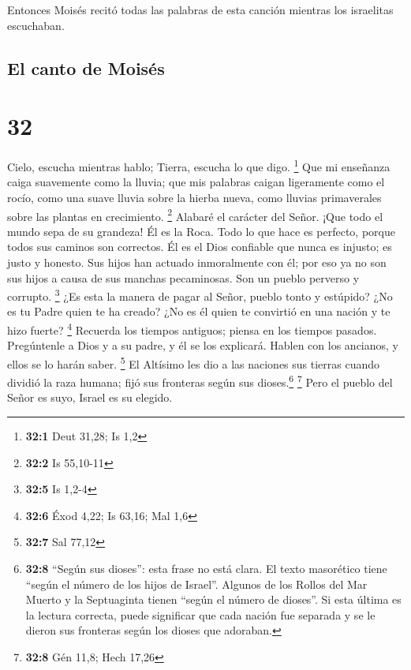  Entonces Moisés recitó todas las palabras de esta
canción mientras los israelitas escuchaban.

\hypertarget{el-canto-de-moisuxe9s}{%
\subsection{El canto de Moisés}\label{el-canto-de-moisuxe9s}}

\hypertarget{section-31}{%
\section{32}\label{section-31}}

 Cielo, escucha mientras hablo; Tierra, escucha lo que
digo. \footnote{\textbf{32:1} Deut 31,28; Is 1,2}  Que mi
enseñanza caiga suavemente como la lluvia; que mis palabras caigan
ligeramente como el rocío, como una suave lluvia sobre la hierba nueva,
como lluvias primaverales sobre las plantas en crecimiento. \footnote{\textbf{32:2}
  Is 55,10-11}  Alabaré el carácter del Señor. ¡Que todo
el mundo sepa de su grandeza!  Él es la Roca. Todo lo que
hace es perfecto, porque todos sus caminos son correctos. Él es el Dios
confiable que nunca es injusto; es justo y honesto.  Sus
hijos han actuado inmoralmente con él; por eso ya no son sus hijos a
causa de sus manchas pecaminosas. Son un pueblo perverso y corrupto.
\footnote{\textbf{32:5} Is 1,2-4}  ¿Es esta la manera de
pagar al Señor, pueblo tonto y estúpido? ¿No es tu Padre quien te ha
creado? ¿No es él quien te convirtió en una nación y te hizo fuerte?
\footnote{\textbf{32:6} Éxod 4,22; Is 63,16; Mal 1,6} 
Recuerda los tiempos antiguos; piensa en los tiempos pasados.
Pregúntenle a Dios y a su padre, y él se los explicará. Hablen con los
ancianos, y ellos se lo harán saber. \footnote{\textbf{32:7} Sal 77,12}
 El Altísimo les dio a las naciones sus tierras cuando
dividió la raza humana; fijó sus fronteras según sus dioses.\footnote{\textbf{32:8}
  ``Según sus dioses'': esta frase no está clara. El texto masorético
  tiene ``según el número de los hijos de Israel''. Algunos de los
  Rollos del Mar Muerto y la Septuaginta tienen ``según el número de
  dioses''. Si esta última es la lectura correcta, puede significar que
  cada nación fue separada y se le dieron sus fronteras según los dioses
  que adoraban.} \footnote{\textbf{32:8} Gén 11,8; Hech 17,26}
 Pero el pueblo del Señor es suyo, Israel es su elegido.
